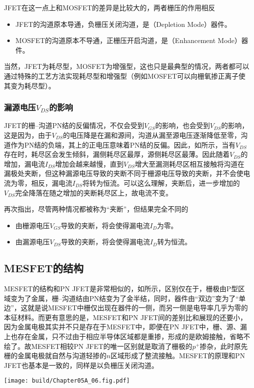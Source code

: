 JFET在这一点上和MOSFET的差异是比较大的，两者栅压的作用相反
\begin{itemize}
    \item JFET的沟道原本导通，负栅压关闭沟道，是（Depletion Mode）器件。
    \item MOSFET的沟道原本不导通，正栅压开启沟道，是（Enhancement Mode）器件。
\end{itemize}
当然，JFET为耗尽型，MOSFET为增强型，这也只是最典型的情况，两者都可以通过特殊的工艺方法实现耗尽型和增强型（例如MOSFET可以向栅氧掺正离子使其变为耗尽型）。

\subsubsection{漏源电压$V_{DS}$的影响}
JFET的栅--沟道PN结的反偏情况，不仅会受到$V_{GS}$的影响，也会受到$V_{DS}$的影响，这是因为，由于$V_{DS}$的电压降是在漏和源间，沟道从漏至源电压逐渐降低至零，沟道作为PN结的负端，其上的正电压意味着PN结的反偏。因此，如所示，当有$V_{DS}$存在时，耗尽区会发生倾斜，漏侧耗尽区最厚，源侧耗尽区最薄。因此随着$V_{DS}$的增加，漏电流$I_{DS}$增加会越来越慢，直到$V_{DS}$增大至漏测耗尽区相互接触将沟道在漏极处夹断，但这种漏源电压导致的夹断不同于栅源电压导致的夹断，并不会使电流为零，相反，漏电流$I_{DS}$将转为恒流。可以这么理解，夹断后，进一步增加的$V_{DS}$完全降落在随之增加的夹断耗尽区上，故电流不变。

再次指出，尽管两种情况都被称为“夹断”，但结果完全不同的
\begin{itemize}
    \item 由栅源电压$V_{GS}$导致的夹断，将会使得漏电流$I_D$为零。
    \item 由漏源电压$V_{DS}$导致的夹断，将会使得漏电流$I_D$转为恒流。
\end{itemize}

\subsection{MESFET的结构}
MESFET的结构和PN JFET是非常相似的，如所示，区别仅在于，栅极由P型区域变为了金属，栅--沟道结由PN结变为了金半结，同时，器件由“双边”变为了“单边”，这就是说MESFET中栅仅出现在器件的一侧，而另一侧是电导率几乎为零的本征材料。而更有意思的是，MESFET和PN JFET间的差别比和展现的还要小，因为金属电极其实并不只是存在于MESFET中，即便在PN JFET中，栅、源、漏上也存在金属，只不过由于相应半导体区域都是重掺，形成的是欧姆接触，省略不绘了。故MESFET相较PN JFET的唯一区别就是取消了栅极的$p^{+}$掺杂，此时原先栅的金属电极就自然与沟道轻掺的$n$区域形成了整流接触。MESFET的原理和PN JFET也基本是一致的，同样是以负栅压关闭沟道。
\begin{Figure}[MESFET的实际结构]
    \texttt{[image: build/Chapter05A\_06.fig.pdf]}
\end{Figure}
